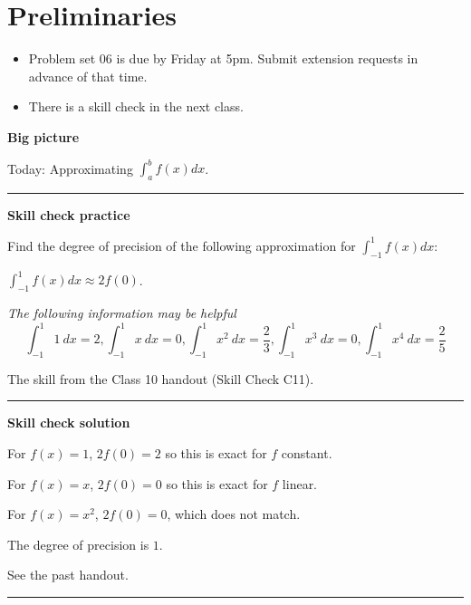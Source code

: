 \documentclass[12pt,letterpaper,noanswers]{exam}
\begin{document}
 \pdfpageheight 11in 
  \pdfpagewidth 8.5in

\noindent 

\section*{Preliminaries}

\begin{itemize}
\itemsep0pt
\item Problem set 06 is due by Friday at 5pm.  Submit extension requests in advance of that time.
\item There is a skill check in the next class.
\end{itemize}


\noindent\textbf{Big picture}

Today: Approximating $\int_{a}^{b}f(x)dx$.

\vspace{0.2cm}
\hrule
\vspace{0.2cm}

\noindent \textbf{Skill check practice}
\begin{questions}
\item Find the degree of precision of the following approximation for $\displaystyle\int_{-1}^1 f(x)dx$:

$\displaystyle\int_{-1}^1 f(x)dx\approx 2f(0)$.

\emph{The following information may be helpful}
\[\int_{-1}^1 1\ dx = 2, \int_{-1}^1 x\ dx = 0, \int_{-1}^1 x^2\ dx = \frac{2}{3}, \int_{-1}^1 x^3\ dx =0, \int_{-1}^1 x^4\ dx = \frac{2}{5}\]
\item The skill from the Class 10 handout (Skill Check C11).
\end{questions}


\vspace{0.2cm}
\hrule
\vspace{0.2cm}

\noindent \textbf{Skill check solution}
\begin{questions}
\item For $f(x) = 1$, $2f(0) = 2$ so this is exact for $f$ constant.

For $f(x) = x$, $2f(0) = 0$ so this is exact for $f$ linear.

For $f(x) = x^2$, $2f(0) = 0$, which does not match.

The degree of precision is $1$.


\item See the past handout.
\end{questions}
\vspace{0.2cm}
\hrule
\vspace{0.2cm}
\end{document}
